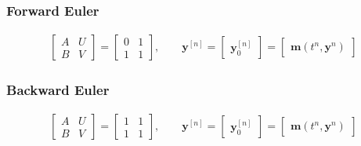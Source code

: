 \subsubsection{Forward Euler}
\begin{align*}
\left[\begin{array}{c|c}
A & U \\
\hline
B & V
\end{array}\right] =
\left[\begin{array}{c|c}
0 & 1 \\
\hline
1 & 1
\end{array}\right],\qquad
\boldsymbol{y}^{[n]}=
\left[\begin{array}{c}
\boldsymbol{y}^{[n]}_0
\end{array}\right]=
\left[\begin{array}{c}
\boldsymbol{m}\left(t^n,\boldsymbol{y}^{n}\right)
\end{array}\right]
\end{align*}

\subsubsection{Backward Euler}
\begin{align*}
\left[\begin{array}{c|c}
A & U \\
\hline
 B & V
\end{array}\right] =
\left[\begin{array}{c|c}
1 & 1 \\
\hline
1 & 1
\end{array}\right],\qquad
\boldsymbol{y}^{[n]}=
\left[\begin{array}{c}
\boldsymbol{y}^{[n]}_0
\end{array}\right]=
\left[\begin{array}{c}
\boldsymbol{m}\left(t^n,\boldsymbol{y}^{n}\right)
\end{array}\right]
\end{align*}


